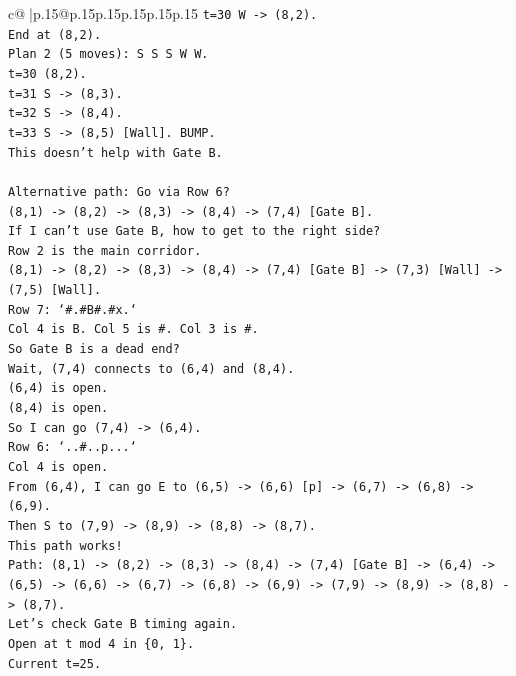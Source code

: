 \documentclass{article}
\begin{document}
{\begin{supertabular}{c@{$\;$}|p{.15\linewidth}@{}p{.15\linewidth}p{.15\linewidth}p{.15\linewidth}p{.15\linewidth}p{.15\linewidth}}
{{{\texttt{t=30 W {-}> (8,2).} \\
\texttt{End at (8,2).} \\
\texttt{Plan 2 (5 moves): S S S W W.} \\
\texttt{t=30 (8,2).} \\
\texttt{t=31 S {-}> (8,3).} \\
\texttt{t=32 S {-}> (8,4).} \\
\texttt{t=33 S {-}> (8,5) {[}Wall{]}. BUMP.} \\
\texttt{This doesn't help with Gate B.} \\
\\ 
\texttt{Alternative path: Go via Row 6?} \\
\texttt{(8,1) {-}> (8,2) {-}> (8,3) {-}> (8,4) {-}> (7,4) {[}Gate B{]}.} \\
\texttt{If I can't use Gate B, how to get to the right side?} \\
\texttt{Row 2 is the main corridor.} \\
\texttt{(8,1) {-}> (8,2) {-}> (8,3) {-}> (8,4) {-}> (7,4) {[}Gate B{]} {-}> (7,3) {[}Wall{]} {-}> (7,5) {[}Wall{]}.} \\
\texttt{Row 7: `\#.\#B\#.\#x.`} \\
\texttt{Col 4 is B. Col 5 is \#. Col 3 is \#.} \\
\texttt{So Gate B is a dead end?} \\
\texttt{Wait, (7,4) connects to (6,4) and (8,4).} \\
\texttt{(6,4) is open.} \\
\texttt{(8,4) is open.} \\
\texttt{So I can go (7,4) {-}> (6,4).} \\
\texttt{Row 6: `..\#..p...`} \\
\texttt{Col 4 is open.} \\
\texttt{From (6,4), I can go E to (6,5) {-}> (6,6) {[}p{]} {-}> (6,7) {-}> (6,8) {-}> (6,9).} \\
\texttt{Then S to (7,9) {-}> (8,9) {-}> (8,8) {-}> (8,7).} \\
\texttt{This path works!} \\
\texttt{Path: (8,1) {-}> (8,2) {-}> (8,3) {-}> (8,4) {-}> (7,4) {[}Gate B{]} {-}> (6,4) {-}> (6,5) {-}> (6,6) {-}> (6,7) {-}> (6,8) {-}> (6,9) {-}> (7,9) {-}> (8,9) {-}> (8,8) {-}> (8,7).} \\
\texttt{Let's check Gate B timing again.} \\
\texttt{Open at t mod 4 in \{0, 1\}.} \\
\texttt{Current t=25.} \\
}}}
\end{supertabular}}
\end{document}
